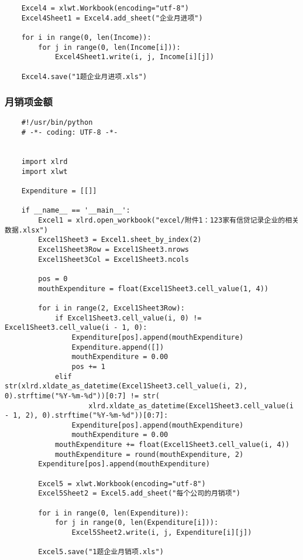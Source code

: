 \documentclass[dvipsnames,withoutpreface,bwprint]{cumcmthesis}
\begin{document}
\begin{appendices}
\begin{lstlisting}
    Excel4 = xlwt.Workbook(encoding="utf-8")
    Excel4Sheet1 = Excel4.add_sheet("企业月进项")

    for i in range(0, len(Income)):
        for j in range(0, len(Income[i])):
            Excel4Sheet1.write(i, j, Income[i][j])

    Excel4.save("1题企业月进项.xls")
\end{lstlisting}
\subsubsection{月销项金额}
\begin{lstlisting}
    #!/usr/bin/python
    # -*- coding: UTF-8 -*-
    
    
    import xlrd
    import xlwt
    
    Expenditure = [[]]
    
    if __name__ == '__main__':
        Excel1 = xlrd.open_workbook("excel/附件1：123家有信贷记录企业的相关数据.xlsx")
        Excel1Sheet3 = Excel1.sheet_by_index(2)
        Excel1Sheet3Row = Excel1Sheet3.nrows
        Excel1Sheet3Col = Excel1Sheet3.ncols
    
        pos = 0
        mouthExpenditure = float(Excel1Sheet3.cell_value(1, 4))
    
        for i in range(2, Excel1Sheet3Row):
            if Excel1Sheet3.cell_value(i, 0) != Excel1Sheet3.cell_value(i - 1, 0):
                Expenditure[pos].append(mouthExpenditure)
                Expenditure.append([])
                mouthExpenditure = 0.00
                pos += 1
            elif str(xlrd.xldate_as_datetime(Excel1Sheet3.cell_value(i, 2), 0).strftime("%Y-%m-%d"))[0:7] != str(
                    xlrd.xldate_as_datetime(Excel1Sheet3.cell_value(i - 1, 2), 0).strftime("%Y-%m-%d"))[0:7]:
                Expenditure[pos].append(mouthExpenditure)
                mouthExpenditure = 0.00
            mouthExpenditure += float(Excel1Sheet3.cell_value(i, 4))
            mouthExpenditure = round(mouthExpenditure, 2)
        Expenditure[pos].append(mouthExpenditure)
    
        Excel5 = xlwt.Workbook(encoding="utf-8")
        Excel5Sheet2 = Excel5.add_sheet("每个公司的月销项")
    
        for i in range(0, len(Expenditure)):
            for j in range(0, len(Expenditure[i])):
                Excel5Sheet2.write(i, j, Expenditure[i][j])
    
        Excel5.save("1题企业月销项.xls")
\end{lstlisting}   

\end{appendices}
\end{document}
